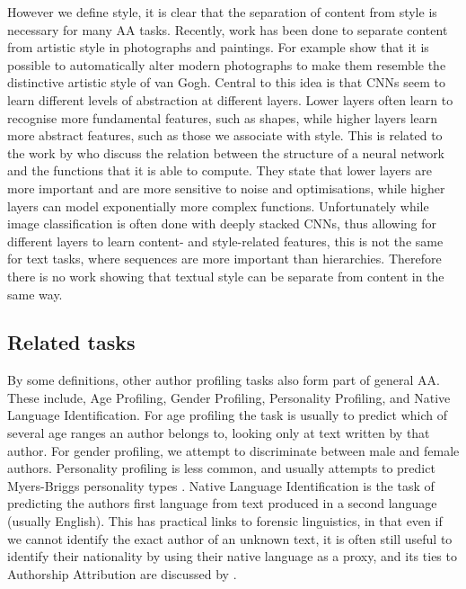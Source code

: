 However we define style, it is clear that the separation of content from style is necessary for many AA tasks. Recently, work has been done to separate content from artistic style in photographs and paintings. For example \citet{gatys2016image} show that it is possible to automatically alter modern photographs to make them resemble the distinctive artistic style of van Gogh. Central to this idea is that CNNs seem to learn different levels of abstraction at different layers. Lower layers often learn to recognise more fundamental features, such as shapes, while higher layers learn more abstract features, such as those we associate with style. This is related to the work by \citet{raghu2016expressive} who discuss the relation between the structure of a neural network and the functions that it is able to compute. They state that lower layers are more important and are more sensitive to noise and optimisations, while higher layers can model exponentially more complex functions. Unfortunately while image classification is often done with deeply stacked CNNs, thus allowing for different layers to learn content- and style-related features, this is not the same for text tasks, where sequences are more important than hierarchies. Therefore there is no work showing that textual style can be separate from content in the same way. 

\subsection{Related tasks}
\label{related-tasks}
By some definitions, other author profiling tasks also form part of general AA. These include, Age Profiling, Gender Profiling, Personality Profiling, and Native Language Identification. For age profiling the task is usually to predict which of several age ranges an author belongs to, looking only at text written by that author. For gender profiling, we attempt to discriminate between male and female authors. Personality profiling is less common, and usually attempts to predict Myers-Briggs personality types \cite{myers1962myers}. Native Language Identification is the task of predicting the authors first language from text produced in a second language (usually English). This has practical links to forensic linguistics, in that even if we cannot identify the exact author of an unknown text, it is often still useful to identify their nationality by using their native language as a proxy, and its ties to Authorship Attribution are discussed by \citet{stolerman2015authorship}. 


